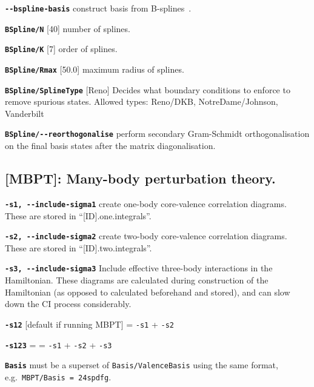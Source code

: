 \documentclass[a4paper,11pt]{article}
\newcommand{\option}[1]{\smallskip\noindent\textbf{\texttt{#1}}}
\begin{document}
\option{-{}-bspline-basis} construct basis from B-splines~\cite{johnson88pra}.

\option{BSpline/N} [40] number of splines.

\option{BSpline/K} [7]  order of splines.

\option{BSpline/Rmax} [50.0] maximum radius of splines.

\option{BSpline/SplineType} [Reno] Decides what boundary conditions to enforce to remove spurious states. Allowed types: Reno/DKB, NotreDame/Johnson, Vanderbilt

\option{BSpline/-{}-reorthogonalise} perform secondary Gram-Schmidt orthogonalisation on the final basis states after the matrix diagonalisation.


\subsection{[MBPT]: Many-body perturbation theory.}

\option{-s1, -{}-include-sigma1} create one-body core-valence correlation diagrams. These are stored in ``[ID].one.integrals''.

\option{-s2, -{}-include-sigma2} create two-body core-valence correlation diagrams. These are stored in ``[ID].two.integrals''.

\option{-s3, -{}-include-sigma3} Include effective three-body interactions in the Hamiltonian. These diagrams are calculated during construction of the Hamiltonian (as opposed to calculated beforehand and stored), and can slow down the CI process considerably.

\option{-s12} [default if running MBPT] = \texttt{-s1} + \texttt{-s2}

\option{-s123} = = \texttt{-s1} + \texttt{-s2} + \texttt{-s3}

\option{Basis} must be a superset of \texttt{Basis/ValenceBasis} using the same format, e.g.~\texttt{MBPT/Basis = 24spdfg}.
\end{document}
